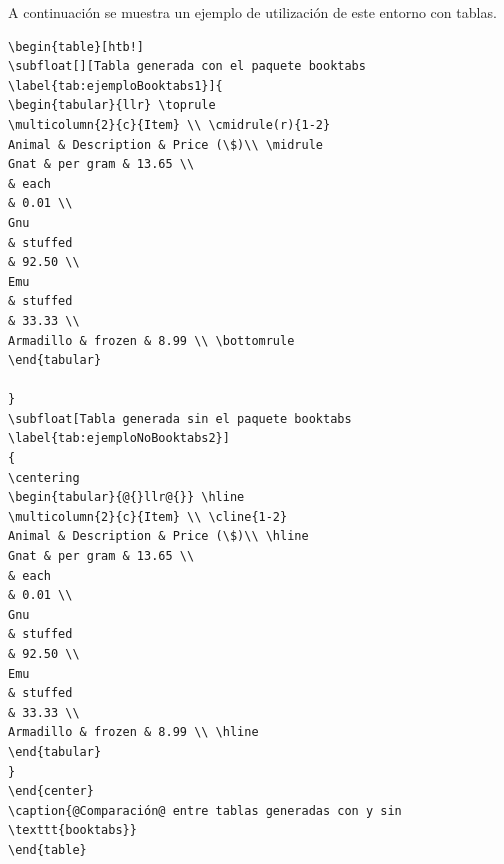 \documentclass[12pt,a4paper, oneside]{report}
\begin{document}
A continuación se muestra un ejemplo de utilización de este entorno con tablas.

\begin{lstlisting}
\begin{table}[htb!]
\subfloat[][Tabla generada con el paquete booktabs
\label{tab:ejemploBooktabs1}]{
\begin{tabular}{llr} \toprule
\multicolumn{2}{c}{Item} \\ \cmidrule(r){1-2}
Animal & Description & Price (\$)\\ \midrule
Gnat & per gram & 13.65 \\
& each
& 0.01 \\
Gnu
& stuffed
& 92.50 \\
Emu
& stuffed
& 33.33 \\
Armadillo & frozen & 8.99 \\ \bottomrule
\end{tabular}

}
\subfloat[Tabla generada sin el paquete booktabs \label{tab:ejemploNoBooktabs2}]
{
\centering
\begin{tabular}{@{}llr@{}} \hline
\multicolumn{2}{c}{Item} \\ \cline{1-2}
Animal & Description & Price (\$)\\ \hline
Gnat & per gram & 13.65 \\
& each
& 0.01 \\
Gnu
& stuffed
& 92.50 \\
Emu
& stuffed
& 33.33 \\
Armadillo & frozen & 8.99 \\ \hline
\end{tabular}
}
\end{center}
\caption{@Comparación@ entre tablas generadas con y sin \texttt{booktabs}}
\end{table}
\end{lstlisting}
\end{document}

